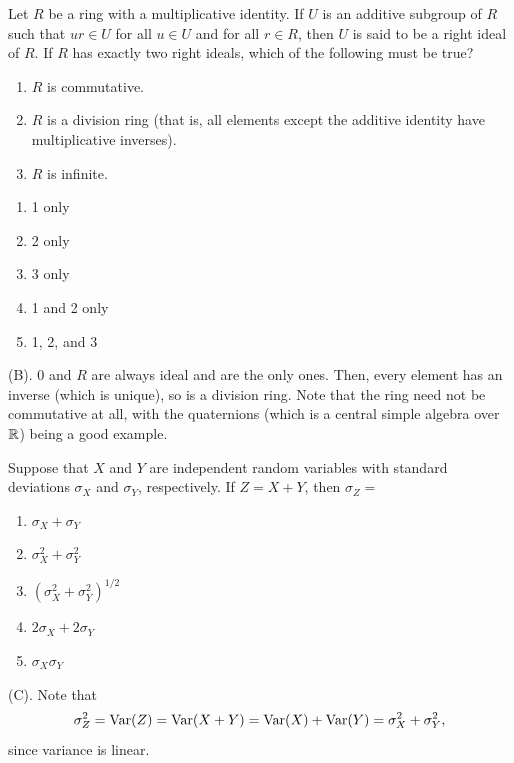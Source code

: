 \begin{exercise}
Let $R$ be a ring with a multiplicative identity. If $U$ is an additive
subgroup of $R$ such that $ur\in U$ for all $u\in U$ and for all $r\in R$,
then $U$ is said to be a right ideal of $R$. If $R$ has exactly two right
ideals, which of the following must be true?
\begin{enumerate}
    \item $R$ is commutative.
    \item $R$ is a division ring (that is, all elements except the additive
    identity have multiplicative inverses).
    \item $R$ is infinite.
\end{enumerate}
\begin{enumerate}[label=(\Alph*)]
    \item 1 only
    \item 2 only
    \item 3 only
    \item 1 and 2 only
    \item 1, 2, and 3
\end{enumerate}
\end{exercise}
\begin{solution}
(B). $0$ and $R$ are always ideal and are the only ones. Then, every element 
has an inverse (which is unique), so is a division ring. Note that the ring 
need not be commutative at all, with the quaternions (which is a central simple 
algebra over $\mathbb{R}$) being a good example.
\end{solution}

\begin{exercise}
Suppose that $X$ and $Y$ are independent random variables with standard
deviations $\sigma_X$ and $\sigma_Y$, respectively. If $Z=X+Y$, then
$\sigma_Z=$
\begin{enumerate}[label=(\Alph*)]
    \item $\sigma_X+\sigma_Y$
    \item $\sigma_X^2+\sigma_Y^2$
    \item $\left(\sigma_X^2+\sigma_Y^2\right)^{1/2}$
    \item $2\sigma_X+2\sigma_Y$
    \item $\sigma_X\sigma_Y$
\end{enumerate}
\end{exercise}
\begin{solution}
(C). Note that
\[
\sigma_Z^2 = \operatorname{Var}(Z) = \operatorname{Var}(X+Y) = \operatorname{Var}(X) + \operatorname{Var}(Y) = \sigma_X^2 + \sigma_Y^2,
\]
since variance is linear.
\end{solution}

